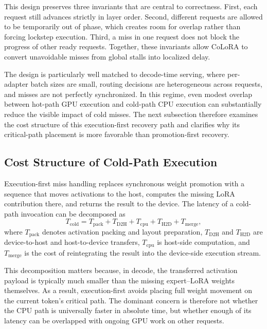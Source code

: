 \documentclass[sigplan,anonymous,review,nonacm]{acmart}
\begin{document}
This design preserves three invariants that are central to correctness. First, each request still advances strictly in layer order. Second, different requests are allowed to be temporarily out of phase, which creates room for overlap rather than forcing lockstep execution. Third, a miss in one request does not block the progress of other ready requests. Together, these invariants allow CoLoRA to convert unavoidable misses from global stalls into localized delay.

The design is particularly well matched to decode-time serving, where per-adapter batch sizes are small, routing decisions are heterogeneous across requests, and misses are not perfectly synchronized. In this regime, even modest overlap between hot-path GPU execution and cold-path CPU execution can substantially reduce the visible impact of cold misses. The next subsection therefore examines the cost structure of this execution-first recovery path and clarifies why its critical-path placement is more favorable than promotion-first recovery.

\subsection{Cost Structure of Cold-Path Execution}
\label{subsec:analytical-formulation}

Execution-first miss handling replaces synchronous weight promotion with a sequence that moves activations to the host, computes the missing LoRA contribution there, and returns the result to the device. The latency of a cold-path invocation can be decomposed as
\begin{equation}
T_{\text{cold}} = T_{\text{pack}} + T_{\text{D2H}} + T_{\text{cpu}} + T_{\text{H2D}} + T_{\text{merge}},
\end{equation}
where $T_{\text{pack}}$ denotes activation packing and layout preparation, $T_{\text{D2H}}$ and $T_{\text{H2D}}$ are device-to-host and host-to-device transfers, $T_{\text{cpu}}$ is host-side computation, and $T_{\text{merge}}$ is the cost of reintegrating the result into the device-side execution stream.

This decomposition matters because, in decode, the transferred activation payload is typically much smaller than the missing expert--LoRA weights themselves. As a result, execution-first avoids placing full weight movement on the current token's critical path. The dominant concern is therefore not whether the CPU path is universally faster in absolute time, but whether enough of its latency can be overlapped with ongoing GPU work on other requests.
\end{document}

